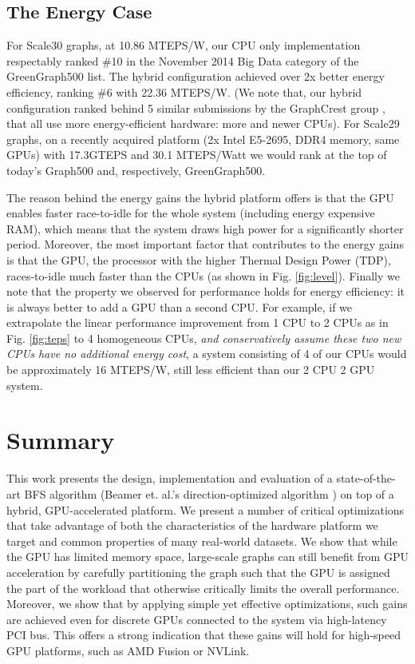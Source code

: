 \documentclass{llncs}
\begin{document}
\subsection{The Energy Case}\label{sec:energy}For Scale30 graphs, at 10.86 MTEPS/W, our CPU only implementation respectably ranked \#10 in the November 2014 Big Data category of the GreenGraph500 list\cite{GreenGraph500}. The hybrid configuration achieved over 2x better energy efficiency, ranking \#6 with 22.36 MTEPS/W. (We note that, our hybrid configuration ranked behind 5 similar submissions by the GraphCrest group \cite{yasui2014fast}, that all use more energy-efficient hardware: more and newer CPUs). 
For Scale29 graphs, on a recently acquired platform (2x Intel E5-2695, DDR4 memory, same GPUs) with 17.3GTEPS and 30.1 MTEPS/Watt we would rank at the top of today's Graph500 and, respectively, GreenGraph500.

The reason behind the energy gains the hybrid platform offers is that the GPU enables faster race-to-idle for the whole system (including energy expensive RAM), which means that the system draws high power for a significantly shorter period. Moreover, the most important factor that contributes to the energy gains is that the GPU, the processor with the higher Thermal Design Power (TDP), races-to-idle much faster than the CPUs (as shown in Fig. \ref{fig:level}). Finally we note that the property we observed for performance holds for energy efficiency: it is always better to add a GPU than a second CPU. For example, if we extrapolate the linear performance improvement from 1 CPU to 2 CPUs as in Fig. \ref{fig:teps} to 4 homogeneous CPUs, \textit{and conservatively assume these two new CPUs have no additional energy cost}, a system consisting of 4 of our CPUs would be approximately 16 MTEPS/W, still less efficient than our 2 CPU 2 GPU system.
\section{Summary}\label{sec:related}This work presents  the design, implementation and evaluation of a state-of-the-art BFS algorithm (Beamer et. al.'s direction-optimized algorithm \cite{beamer2011searching}) on top of a hybrid, GPU-accelerated platform. We present a number of critical optimizations that take advantage of both the characteristics of the hardware platform we target and common properties of many real-world datasets. We show that while the GPU has limited memory space, large-scale graphs can still benefit from GPU acceleration by carefully partitioning the graph such that the GPU is assigned the part of the workload that otherwise critically limits the overall performance. Moreover, we show that by applying simple yet effective optimizations, such gains are achieved even for discrete GPUs connected to the system via high-latency PCI bus. This offers a strong indication that these gains will hold for high-speed GPU platforms, such as AMD Fusion or NVLink.
\end{document}
